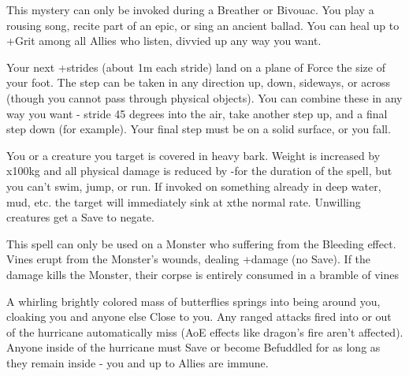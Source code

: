 {This mystery can only be invoked during a Breather or Bivouac.  You play a rousing song, recite part of an epic, or sing an ancient ballad.  You can heal up to \SUMDICE+\DICE Grit among all Allies who listen, divvied up any way you want.

\MYSTERY [
  Name = Vaulting Step,
  Link = arcana-mystery-vaulting-step,
  Paradigm = Force,
  Save = N,
  Duration = Instant,
  Target = Self
]

Your next \DICE+\DICE strides (about 1m each stride) land on a plane of Force the size of your foot.  The step can be taken in any direction up, down, sideways, or across (though you cannot pass through physical objects).  You can combine these in any way you want - stride 45 degrees into the air, take another step up, and a final step down (for example).  Your final step must be on a solid surface, or you fall. 


\MYSTERY [
  Name = Barkskin,
  Link = arcana-mystery-barkskin,
  Paradigm = Biomancy,
  Save = Y (neg.),
  Duration = Combat or \SUM Minutes,
  Target = Self or Close Target(s)
]

You or a creature you target is covered in heavy bark.  Weight is increased by \DICE x100kg and all physical damage is reduced by -\DICE for the duration of the spell, but you can't swim, jump, or run. If invoked on something already in deep water, mud, etc. the target will immediately sink at x\DICE the normal rate. Unwilling creatures get a Save to negate. 

\MYSTERY [
  Name = Bloodvine,
  Link = arcana-mystery-bloodvine,
  Paradigm = Biomancy,
  Save = N,
  Duration = Instant,
  Target = Close or Nearby Target(s)
]

This spell can only be used on a Monster who suffering from the Bleeding effect.  Vines erupt from the Monster's wounds, dealing \SUMDICE+\DICE damage (no Save).  If the damage kills the Monster, their corpse is entirely consumed in a bramble of vines

\MYSTERY [
  Name = Butterfly Hurricane,
  Link = arcana-mystery-butterfly-hurricane,
  Paradigm = Biomancy,
  Save = Y (neg.),
  Duration = Combat or \SUM Minutes,
  Target = Self
]

A whirling brightly colored mass of butterflies springs into being around you, cloaking you and anyone else Close to you.  Any ranged attacks fired into or out of the hurricane automatically miss (AoE effects like dragon's fire aren't affected).  Anyone inside of the hurricane must Save or become Befuddled for as long as they remain inside - you and up to \DICE Allies are immune.

}
